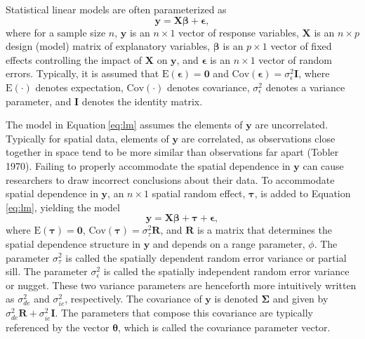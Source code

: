 \documentclass{article}
\begin{document}
Statistical linear models are often parameterized as
\begin{equation}\label{eq:lm}
 \mathbf{y} = \mathbf{X} \boldsymbol{\beta} + \boldsymbol{\epsilon},
\end{equation} where for a sample size \(n\), \(\mathbf{y}\) is an
\(n \times 1\) vector of response variables, \(\mathbf{X}\) is an
\(n \times p\) design (model) matrix of explanatory variables,
\(\boldsymbol{\beta}\) is an \(p \times 1\) vector of fixed effects
controlling the impact of \(\mathbf{X}\) on \(\mathbf{y}\), and
\(\boldsymbol{\epsilon}\) is an \(n \times 1\) vector of random errors.
Typically, it is assumed that
\(\text{E}(\boldsymbol{\epsilon}) = \mathbf{0}\) and
\(\text{Cov}(\boldsymbol{\epsilon}) = \sigma^2_\epsilon \mathbf{I}\),
where \(\text{E}(\cdot)\) denotes expectation, \(\text{Cov}(\cdot)\)
denotes covariance, \(\sigma^2_\epsilon\) denotes a variance parameter,
and \(\mathbf{I}\) denotes the identity matrix.

The model in Equation\(~\)\ref{eq:lm} assumes the elements of
\(\mathbf{y}\) are uncorrelated. Typically for spatial data, elements of
\(\mathbf{y}\) are correlated, as observations close together in space
tend to be more similar than observations far apart (Tobler 1970).
Failing to properly accommodate the spatial dependence in \(\mathbf{y}\)
can cause researchers to draw incorrect conclusions about their data. To
accommodate spatial dependence in \(\mathbf{y}\), an \(n \times 1\)
spatial random effect, \(\boldsymbol{\tau}\), is added to
Equation\(~\)\ref{eq:lm}, yielding the model
\begin{equation}\label{eq:splm}
 \mathbf{y} = \mathbf{X} \boldsymbol{\beta} + \boldsymbol{\tau} + \boldsymbol{\epsilon},
\end{equation} where \(\text{E}(\boldsymbol{\tau}) = \mathbf{0}\),
\(\text{Cov}(\boldsymbol{\tau}) = \sigma^2_\tau \mathbf{R}\), and
\(\mathbf{R}\) is a matrix that determines the spatial dependence
structure in \(\mathbf{y}\) and depends on a range parameter, \(\phi\).
The parameter \(\sigma^2_\tau\) is called the spatially dependent random
error variance or partial sill. The parameter \(\sigma^2_\epsilon\) is
called the spatially independent random error variance or nugget. These
two variance parameters are henceforth more intuitively written as
\(\sigma^2_{de}\) and \(\sigma^2_{ie}\), respectively. The covariance of
\(\mathbf{y}\) is denoted \(\boldsymbol{\Sigma}\) and given by
\(\sigma^2_{de} \mathbf{R} + \sigma^2_{ie} \mathbf{I}\). The parameters
that compose this covariance are typically referenced by the vector
\(\boldsymbol{\theta}\), which is called the covariance parameter
vector.
\end{document}
